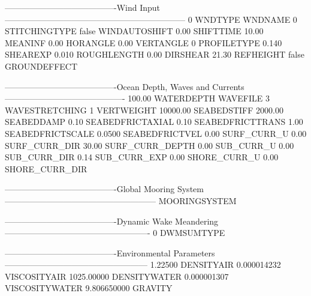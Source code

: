 \begin{cfgcode}
----------------------------------------Wind Input-----------------------------------------------------------------
0                                      WNDTYPE
                                       WNDNAME
0                                      STITCHINGTYPE
false                                   WINDAUTOSHIFT
0.00                                   SHIFTTIME
10.00                                  MEANINF
0.00                                   HORANGLE
0.00                                   VERTANGLE
0                                      PROFILETYPE
0.140                                  SHEAREXP
0.010                                  ROUGHLENGTH
0.00                                   DIRSHEAR
21.30                                  REFHEIGHT
false                                  GROUNDEFFECT

----------------------------------------Ocean Depth, Waves and Currents-------------------------------------------
100.00                                 WATERDEPTH
                                           WAVEFILE
3                                      WAVESTRETCHING
1                                      VERTWEIGHT
10000.00                               SEABEDSTIFF
2000.00                                SEABEDDAMP
0.10                                   SEABEDFRICTAXIAL
0.10                                   SEABEDFRICTTRANS
1.00                                   SEABEDFRICTSCALE
0.0500                                 SEABEDFRICTVEL
0.00                                   SURF_CURR_U
0.00                                   SURF_CURR_DIR
30.00                                  SURF_CURR_DEPTH
0.00                                   SUB_CURR_U
0.00                                   SUB_CURR_DIR
0.14                                   SUB_CURR_EXP
0.00                                   SHORE_CURR_U
0.00                                   SHORE_CURR_DIR

----------------------------------------Global Mooring System------------------------------------------------------
                                       MOORINGSYSTEM

----------------------------------------Dynamic Wake Meandering----------------------------------------------------
0                                      DWMSUMTYPE

----------------------------------------Environmental Parameters---------------------------------------------------
1.22500                                DENSITYAIR
0.000014232                            VISCOSITYAIR
1025.00000                             DENSITYWATER
0.000001307                            VISCOSITYWATER
9.806650000                            GRAVITY


\end{cfgcode}
